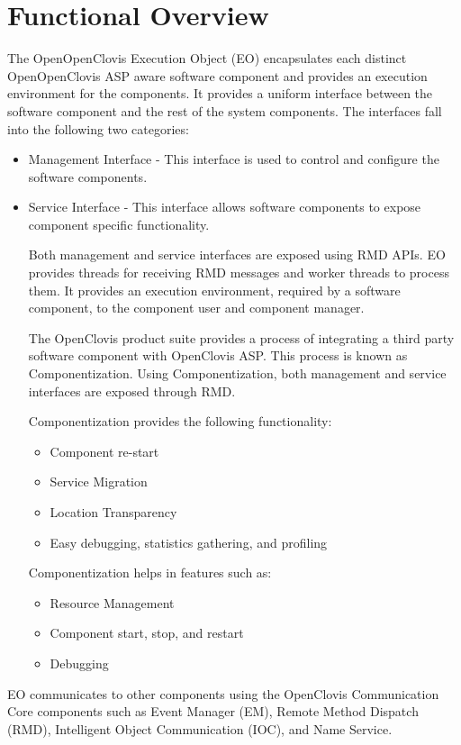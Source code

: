 \hypertarget{group__group19}{
\chapter{Functional Overview}
\label{group__group19}
}

\begin{flushleft}
The OpenOpenClovis Execution Object (EO) encapsulates each distinct OpenOpenClovis ASP aware software component and provides an execution environment for
the components. It provides a uniform interface between the software component and the rest of the system components. The interfaces fall into the
following two categories:
\begin{itemize}
\item Management Interface - This interface is used to control and configure the software components. 
\item Service Interface - This interface allows software components to expose component specific functionality. \par
 \par
 Both management and service interfaces are exposed using RMD APIs. EO provides threads for receiving RMD messages and worker threads to process them. It
 provides an execution environment, required by a software component, to the component user and component manager. \par
 \par
 The OpenClovis product suite provides a process of integrating a third party software component with OpenClovis ASP. This process is known as
 Componentization. Using Componentization, both management and service interfaces are exposed through RMD. \par
 \par
 Componentization provides the following functionality: 
 \begin{itemize}
 \item Component re-start
 \item Service Migration 
 \item Location Transparency 
 \item Easy debugging, statistics gathering, and profiling 
\end{itemize}
Componentization helps in features such as: 
\begin{itemize}
 \item Resource Management 
 \item Component start, stop, and restart 
 \item Debugging
 \end{itemize}
 \end{itemize}
EO communicates to other components using the OpenClovis Communication Core
components such as Event Manager (EM), Remote Method Dispatch (RMD), Intelligent Object Communication (IOC), and Name Service. 



\end{flushleft}
